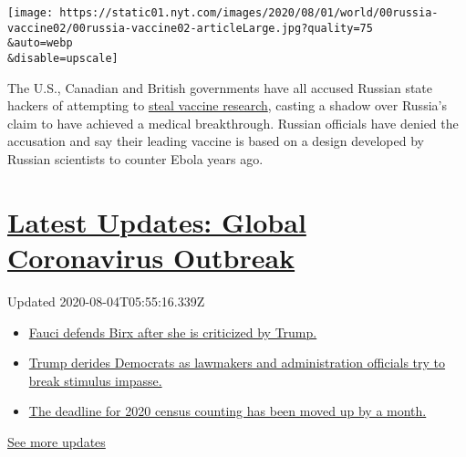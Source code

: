 \texttt{[image: https://static01.nyt.com/images/2020/08/01/world/00russia-vaccine02/00russia-vaccine02-articleLarge.jpg?quality=75\\\&auto=webp\\\&disable=upscale]}

The U.S., Canadian and British governments have all accused Russian
state hackers of attempting to
\href{https://www.nytimes.com/2020/07/16/us/politics/vaccine-hacking-russia.html}{steal
vaccine research}, casting a shadow over Russia's claim to have achieved
a medical breakthrough. Russian officials have denied the accusation and
say their leading vaccine is based on a design developed by Russian
scientists to counter Ebola years ago.

\hypertarget{latest-updates-global-coronavirus-outbreak}{%
\section{\texorpdfstring{\href{https://www.nytimes.com/2020/08/03/world/coronavirus-covid-19.html?action=click\&pgtype=Article\&state=default\&region=MAIN_CONTENT_1\&context=storylines_live_updates}{Latest
Updates: Global Coronavirus
Outbreak}}{Latest Updates: Global Coronavirus Outbreak}}\label{latest-updates-global-coronavirus-outbreak}}

Updated 2020-08-04T05:55:16.339Z

\begin{itemize}
\tightlist
\item
  \href{https://www.nytimes.com/2020/08/03/world/coronavirus-covid-19.html?action=click\&pgtype=Article\&state=default\&region=MAIN_CONTENT_1\&context=storylines_live_updates\#link-4547638f}{Fauci
  defends Birx after she is criticized by Trump.}
\item
  \href{https://www.nytimes.com/2020/08/03/world/coronavirus-covid-19.html?action=click\&pgtype=Article\&state=default\&region=MAIN_CONTENT_1\&context=storylines_live_updates\#link-15e7f995}{Trump
  derides Democrats as lawmakers and administration officials try to
  break stimulus impasse.}
\item
  \href{https://www.nytimes.com/2020/08/03/world/coronavirus-covid-19.html?action=click\&pgtype=Article\&state=default\&region=MAIN_CONTENT_1\&context=storylines_live_updates\#link-e5a2cda}{The
  deadline for 2020 census counting has been moved up by a month.}
\end{itemize}

\href{https://www.nytimes.com/2020/08/03/world/coronavirus-covid-19.html?action=click\&pgtype=Article\&state=default\&region=MAIN_CONTENT_1\&context=storylines_live_updates}{See
more updates}

